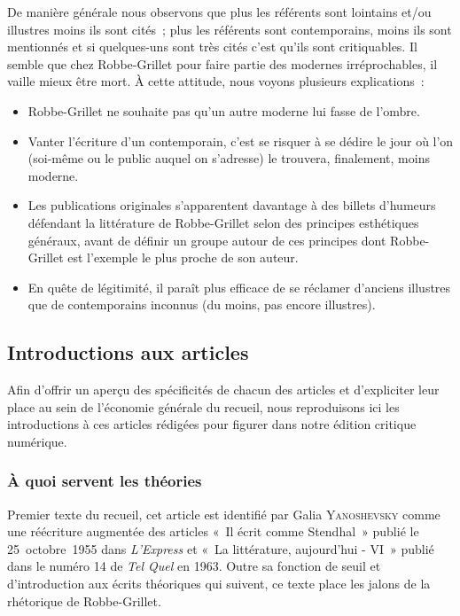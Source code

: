 \documentclass[12pt, a4paper]{article}
\begin{document}
De manière générale nous observons que plus les référents sont lointains et/ou illustres moins ils sont cités~; plus les référents sont contemporains, moins ils sont mentionnés et si quelques-uns sont très cités c'est qu'ils sont critiquables. Il semble que chez Robbe-Grillet pour faire partie des modernes irréprochables, il vaille mieux être mort. À cette attitude, nous voyons plusieurs explications~:
\begin{itemize}
    \item Robbe-Grillet ne souhaite pas qu'un autre moderne lui fasse de l'ombre.
    \item Vanter l'écriture d'un contemporain, c'est se risquer à se dédire le jour où l'on (soi-même ou le public auquel on s'adresse) le trouvera, finalement, moins moderne.
    \item Les publications originales s'apparentent davantage à des billets d'humeurs défendant la littérature de Robbe-Grillet selon des principes esthétiques généraux, avant de définir un groupe autour de ces principes dont Robbe-Grillet est l'exemple le plus proche de son auteur.
    \item En quête de légitimité, il paraît plus efficace de se réclamer d'anciens illustres que de contemporains inconnus (du moins, pas encore illustres).
\end{itemize}




\subsection{Introductions aux articles}

Afin d'offrir un aperçu des spécificités de chacun des articles et d'expliciter leur place au sein de l'économie générale du recueil, nous reproduisons ici les introductions à ces articles rédigées pour figurer dans notre édition critique numérique.
\subsubsection{À quoi servent les théories}
Premier texte du recueil, cet article est identifié par Galia \textsc{Yanoshevsky} comme une réécriture augmentée des articles «~Il écrit comme Stendhal~» publié le 25~octobre~1955 dans \textit{L'Express} et «~La littérature, aujourd'hui - VI~» publié dans le numéro 14 de \textit{Tel Quel} en 1963. Outre sa fonction de seuil et d'introduction aux écrits théoriques qui suivent, ce texte place les jalons de la rhétorique de Robbe-Grillet.
\end{document}
